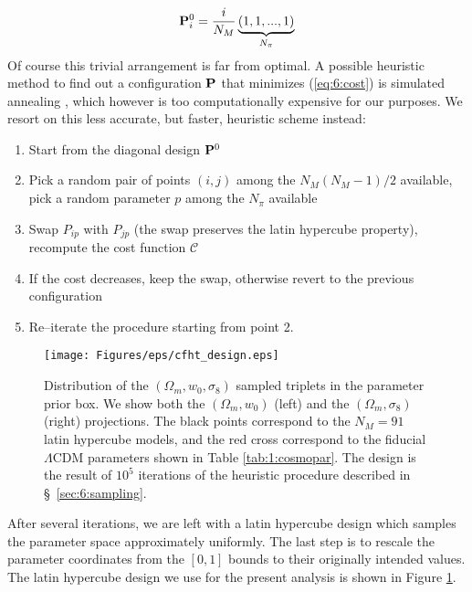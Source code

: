 \begin{equation}
\label{eq:6:diagonal}
\mathbf{P}^0_{i} = \frac{i}{N_M}\underbrace{(1,1,...,1)}_{N_\pi}
\end{equation}
%  
Of course this trivial arrangement is far from optimal. A possible heuristic method to find out a configuration $\mathbf{P}$ that minimizes (\ref{eq:6:cost}) is simulated annealing \citep{Skiena}, which however is too computationally expensive for our purposes. We resort on this less accurate, but faster, heuristic scheme instead: 
\begin{enumerate}
\item Start from the diagonal design $\mathbf{P}^0$
\item Pick a random pair of points $(i,j)$ among the $N_M(N_M-1)/2$ available, pick a random parameter $p$ among the $N_\pi$ available
\item Swap $P_{ip}$ with $P_{jp}$ (the swap preserves the latin hypercube property), recompute the cost function $\mathcal{C}$
\item If the cost decreases, keep the swap, otherwise revert to the previous configuration
\item Re--iterate the procedure starting from point 2. 
\end{enumerate}
%
\begin{figure}
\begin{center}
\texttt{[image: Figures/eps/cfht\_design.eps]}
\end{center}
\caption{Distribution of the $(\Omega_m,w_0,\sigma_8)$ sampled triplets in the parameter prior box. We show both the $(\Omega_m,w_0)$ (left) and the $(\Omega_m,\sigma_8)$ (right) projections. The black points correspond to the $N_M=91$ latin hypercube models, and the red cross correspond to the fiducial $\Lambda$CDM parameters shown in Table \ref{tab:1:cosmopar}. The design is the result of $10^5$ iterations of the heuristic procedure described in \S~\ref{sec:6:sampling}.}
\label{fig:6:sampling}
\end{figure}
%
After several iterations, we are left with a latin hypercube design which samples the parameter space approximately uniformly. The last step is to rescale the parameter coordinates from the $[0,1]$ bounds to their originally intended values. The latin hypercube design we use for the present analysis is shown in Figure \ref{fig:6:sampling}. 

